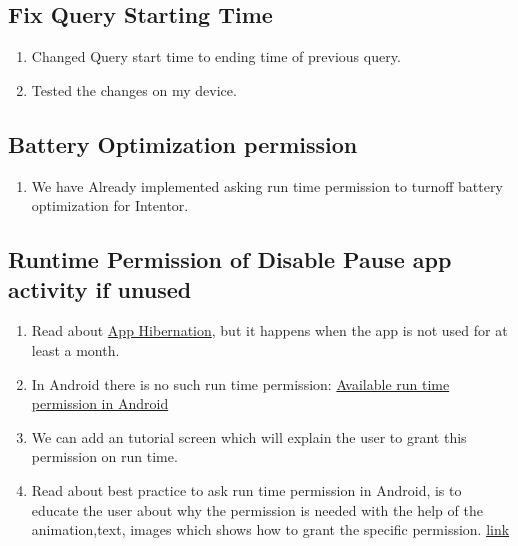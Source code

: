 \documentclass[12pt]{article}
\begin{document}
    \subsection{Fix Query Starting Time}
    \begin{enumerate}
    \item Changed Query start time to ending time of previous query.
    \item Tested the changes on my device.
    \end{enumerate}
    \subsection{Battery Optimization permission }
    \begin{enumerate}
        \item We have Already implemented asking run time permission to turnoff battery optimization for Intentor.
    \end{enumerate}
    \subsection{Runtime Permission of  Disable Pause app activity if unused}
    \begin{enumerate}
        \item Read about \href{https://developer.android.com/topic/performance/app-hibernation}{App Hibernation},  but it happens when the app is not used for at least a month.
        \item In Android there is no such run time permission: \href{https://developer.android.com/reference/android/Manifest.permission}{Available run time permission in Android}
        \item We can add an tutorial screen which will explain the user to grant this permission on run time.
        \item Read about best practice to ask run time permission in Android, is to educate the user about why the permission is needed with the help of the animation,text, images which shows how to grant the specific permission. \href{https://m2.material.io/design/platform-guidance/android-permissions.html#usage}{link}
    \end{enumerate}
\end{document}
